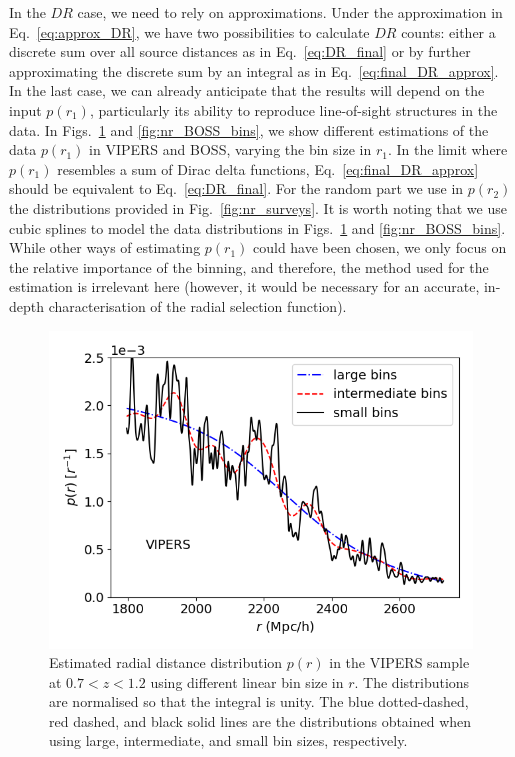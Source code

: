 \documentclass{aa}
\begin{document}
In the $DR$ case, we need to rely on approximations.
Under the approximation in Eq.~\eqref{eq:approx_DR}, we have two possibilities to calculate $DR$ counts: either a discrete sum over all source distances as in Eq.~\eqref{eq:DR_final} or by further approximating the discrete sum by an integral as in Eq.~\eqref{eq:final_DR_approx}. In the last case, we can already anticipate that the results will depend on the input $p(r_1)$, particularly its ability to reproduce line-of-sight structures in the data. In Figs.~\ref{fig:nr_VIPERS_bins} and \ref{fig:nr_BOSS_bins}, we show different estimations of the data $p(r_1)$ in VIPERS and BOSS, varying the bin size in $r_1$. In the limit where $p(r_1)$ resembles a sum of Dirac delta functions, Eq.~\eqref{eq:final_DR_approx} should be equivalent to Eq.~\eqref{eq:DR_final}. For the random part we use in $p(r_2)$ the distributions provided in Fig.~\ref{fig:nr_surveys}. It is worth noting that we use cubic splines to model the data distributions in Figs.~\ref{fig:nr_VIPERS_bins} and \ref{fig:nr_BOSS_bins}. While other ways of estimating $p(r_1)$ could have been chosen, we only focus on the relative importance of the binning, and therefore, the method used for the estimation is irrelevant here (however, it would be necessary for an accurate, in-depth characterisation of the radial selection function).
%
\begin{figure}
\includegraphics[width=\columnwidth]{Figures/fig_nr_aspic_vipers_select2} 
\caption{Estimated radial distance distribution $p(r)$ in the VIPERS sample at $0.7<z<1.2$ using different linear bin size in $r$. The distributions are normalised so that the integral is unity. The blue dotted-dashed, red dashed, and black solid lines are the distributions obtained when using large, intermediate, and small bin sizes, respectively.}
    \label{fig:nr_VIPERS_bins}
\end{figure}
\end{document}
